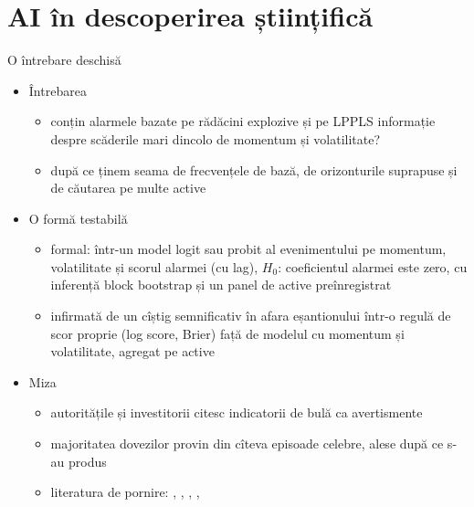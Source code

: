 \section{AI în descoperirea științifică}

\begin{frame}{O întrebare deschisă}
\itemsize{\small}
\begin{itemize}
    \item Întrebarea
    \begin{itemize}
        \item conțin alarmele bazate pe rădăcini explozive și pe LPPLS informație despre scăderile mari dincolo de momentum și volatilitate?
        \item după ce ținem seama de frecvențele de bază, de orizonturile suprapuse și de căutarea pe multe active
    \end{itemize}
    \item O formă testabilă
    \begin{itemize}
        \item formal: într-un model logit sau probit al evenimentului pe momentum, volatilitate și scorul alarmei (cu lag), $H_0$: coeficientul alarmei este zero, cu inferență block bootstrap și un panel de active preînregistrat
        \item infirmată de un cîștig semnificativ în afara eșantionului într-o regulă de scor proprie (log score, Brier) față de modelul cu momentum și volatilitate, agregat pe active
    \end{itemize}
    \item Miza
    \begin{itemize}
        \item autoritățile și investitorii citesc indicatorii de bulă ca avertismente
        \item majoritatea dovezilor provin din cîteva episoade celebre, alese după ce s-au produs
        \item literatura de pornire: , , , , 
    \end{itemize}
\end{itemize}
\end{frame}

